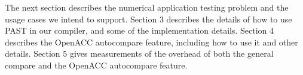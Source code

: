 The next section describes the numerical application testing problem and the usage cases we intend to support.
Section 3 describes the details of how to use PAST in our compiler, and some of the implementation details.
Section 4 describes the OpenACC autocompare feature, including how to use it and other details.
Section 5 gives measurements of the overhead of both the general compare and the OpenACC autocompare feature.

